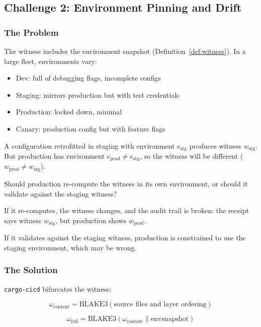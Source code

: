 \subsection{Challenge 2: Environment Pinning and Drift}

\subsubsection{The Problem}

The witness includes the environment snapshot (Definition~\ref{def:witness}). In a large fleet, environments vary:

\begin{itemize}
  \item Dev: full of debugging flags, incomplete configs
  \item Staging: mirrors production but with test credentials
  \item Production: locked down, minimal
  \item Canary: production config but with feature flags
\end{itemize}

A configuration retrofitted in staging with environment $e_{\mathrm{stg}}$ produces witness $w_{\mathrm{stg}}$. But production has environment $e_{\mathrm{prod}} \neq e_{\mathrm{stg}}$, so the witness will be different ($w_{\mathrm{prod}} \neq w_{\mathrm{stg}}$).

Should production re-compute the witness in its own environment, or should it validate against the staging witness?

If it re-computes, the witness changes, and the audit trail is broken: the receipt says witness $w_{\mathrm{stg}}$, but production shows $w_{\mathrm{prod}}$.

If it validates against the staging witness, production is constrained to use the staging environment, which may be wrong.

\subsubsection{The Solution}

\texttt{cargo-cicd} bifurcates the witness:

\begin{equation}
\omega_{\mathrm{content}} = \mathrm{BLAKE3}(\text{source files and layer ordering})
\end{equation}

\begin{equation}
\omega_{\mathrm{full}} = \mathrm{BLAKE3}(\omega_{\mathrm{content}} \| \mathrm{env snapshot})
\end{equation}

